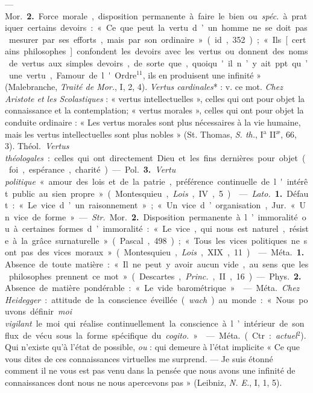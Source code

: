\begin{itemize}[leftmargin=1cm, label=, itemsep=1pt]
— \si{Mor.}  {\bf 2.} Force morale, disposition permanente à faire le bien ou
{\it spéc.} à pratiquer certains devoirs : « Ce que peut la vertu d’un homme
ne se doit pas mesurer par ses efforts, mais par son ordinaire » (id., 352) ;
« Ils [certains philosophes] confondent les devoirs avec les vertus ou
donnent des noms de vertus aux simples devoirs, de sorte que, quoiqu'il n’y
ait ppt. qu’une vertu, Famour de l'Ordre$^{11}$, ils en produisent une
infinité » (Malebranche, {\it Traité de Mor.}, I, 2, 4). {\it Vertus
cardinales}* : v. ce mot. {\it Chez Aristote et les Scolastiques} : « vertus
intellectuelles », celles qui ont pour objet la connaissance et la
contemplation; « vertus morales », celles qui ont pour objet la conduite
ordinaire : « Les vertus morales sont plus nécessaires à la vie humaine, mais
les vertus intellectuelles sont plus nobles » (St. Thomas, {\it S. th.},
I$^\text{a}$ II$^\text{æ}$, 66, 3). \si{Théol.} {\it Vertus théologales} :
celles qui ont directement Dieu et les fins dernières pour objet (foi,
espérance, charité).

— \si{Pol.} {\bf 3.} {\it Vertu politique} « amour des lois et de la
patrie,... préférence continuelle de l'intérêt public au sien propre
» (Montesquieu, {\it Lois}, IV, 5).

 — {\it Lato.} {\bf 1.} Défaut : « Le vice d’un
raisonnement »; « Un vice d’organisation, \si{Jur.} « Un vice de forme ».

— {\it Str.} \si{Mor.}  {\bf 2.} Disposition permanente à l’immoralité ou à
certaines formes d’immoralité : « Le vice, qui nous est naturel, résiste à la
grâce surnaturelle » (Pascal, 498) ; « Tous les vices politiques ne sont pas
des vices moraux » (Montesquieu, {\it Lois}, XIX, 11).

 — \si{Méta.} {\bf 1.} Absence de toute matière : « Il ne peut y
avoir aucun vide, au sens que les philosophes prennent ce mot » (Descartes,
{\it Princ.}, II, 16). — \si{Phys.}  {\bf 2.} Absence de matière pondérable :
« Le vide barométrique. »

 — \si{Méta.} {\it Chez Heidegger} : attitude de la conscience
éveillée ({\it wach}) au monde : « Nous pouvons définir {\it moi vigilant} le
moi qui réalise continuellement la conscience à l’intérieur de son flux de
vécu sous la forme spécifique du {\it cogito.} »

 — \si{Méta.} (Ctr. : {\it actuel}$^2$). Qui n'existe qu’à l’état
de possible, {\it ou} : qui demeure à l’état implicite « Ce que vous dites de
ces connaissances virtuelles me surprend. — Je suis étonné comment il ne vous
est pas venu dans la pensée que nous avons une infinité de connaissances dont
nous ne nous apercevons pas » (Leibniz, {\it N. E.}, I, 1, 5).


\end{itemize}
